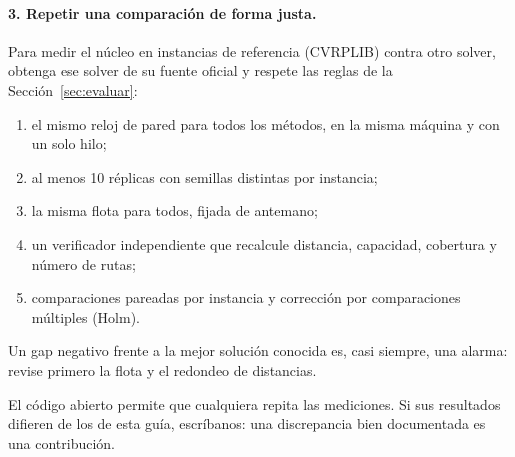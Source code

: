 \documentclass[11pt,a4paper]{article}
\begin{document}
\paragraph{3. Repetir una comparación de forma justa.} Para medir el núcleo en instancias de
referencia (CVRPLIB) contra otro solver, obtenga ese solver de su fuente oficial y respete las reglas
de la Sección~\ref{sec:evaluar}:
\begin{enumerate}[leftmargin=1.5em]
\item el mismo reloj de pared para todos los métodos, en la misma máquina y con un solo hilo;
\item al menos 10 réplicas con semillas distintas por instancia;
\item la misma flota para todos, fijada de antemano;
\item un verificador independiente que recalcule distancia, capacidad, cobertura y número de rutas;
\item comparaciones pareadas por instancia y corrección por comparaciones múltiples (Holm).
\end{enumerate}
Un gap negativo frente a la mejor solución conocida es, casi siempre, una alarma: revise primero la
flota y el redondeo de distancias.

\begin{ideaclave}
El código abierto permite que cualquiera repita las mediciones. Si sus resultados difieren de los de
esta guía, escríbanos: una discrepancia bien documentada es una contribución.
\end{ideaclave}




\appendix
\end{document}
